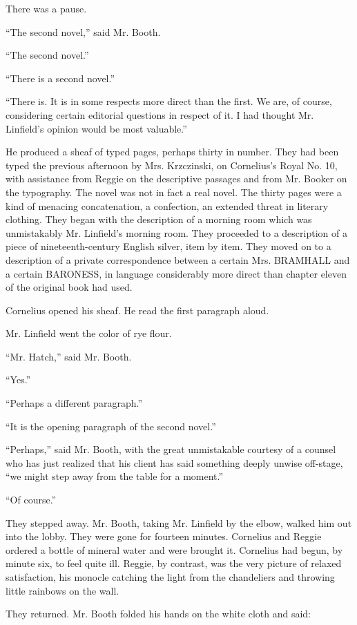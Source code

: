 \documentclass[12pt,openright]{book}
\begin{document}
There was a pause.

“The second novel,” said Mr. Booth.

“The second novel.”

“There is a second novel.”

“There is. It is in some respects more direct than the first. We are, of course, considering certain editorial questions in respect of it. I had thought Mr. Linfield’s opinion would be most valuable.”

He produced a sheaf of typed pages, perhaps thirty in number. They had been typed the previous afternoon by Mrs. Krzczinski, on Cornelius’s Royal No. 10, with assistance from Reggie on the descriptive passages and from Mr. Booker on the typography. The novel was not in fact a real novel. The thirty pages were a kind of menacing concatenation, a confection, an extended threat in literary clothing. They began with the description of a morning room which was unmistakably Mr. Linfield’s morning room. They proceeded to a description of a piece of nineteenth-century English silver, item by item. They moved on to a description of a private correspondence between a certain Mrs. BRAMHALL and a certain BARONESS, in language considerably more direct than chapter eleven of the original book had used.

Cornelius opened his sheaf. He read the first paragraph aloud.

Mr. Linfield went the color of rye flour.

“Mr. Hatch,” said Mr. Booth.

“Yes.”

“Perhaps a different paragraph.”

“It is the opening paragraph of the second novel.”

“Perhaps,” said Mr. Booth, with the great unmistakable courtesy of a counsel who has just realized that his client has said something deeply unwise off-stage, “we might step away from the table for a moment.”

“Of course.”

They stepped away. Mr. Booth, taking Mr. Linfield by the elbow, walked him out into the lobby. They were gone for fourteen minutes. Cornelius and Reggie ordered a bottle of mineral water and were brought it. Cornelius had begun, by minute six, to feel quite ill. Reggie, by contrast, was the very picture of relaxed satisfaction, his monocle catching the light from the chandeliers and throwing little rainbows on the wall.

They returned. Mr. Booth folded his hands on the white cloth and said:
\end{document}
